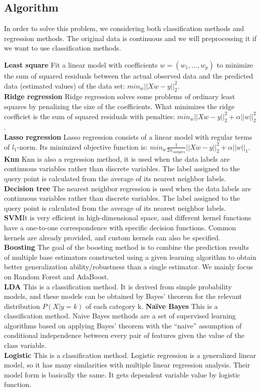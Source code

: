 \documentclass{article}
\begin{document}
\subsection{Algorithm}

In order to solve this problem, we considering both classification methods and regression methods. The original data is continuous and we will preprocessing it if we want to use classification methods.

\textbf{Least square} Fit a linear model with coefficients $w = (w_1, ..., w_p)$ to minimize the sum of squared residuals between the actual observed data and the predicted data (estimated values) of the data set: $min_w ||Xw-y||_2^2$.\\
\textbf{Ridge regression} Ridge regression solves some problems of ordinary least squares by penalizing the size of the coefficients. What minimizes the ridge coefficiet is the sum of squared residuals with penalties: $min_w ||Xw-y||_2^2+\alpha ||w||_2^2$.\\
\textbf{Lasso regression} Lasso regression consists of a linear model with regular terms of $l_1$-norm. Its minimized objective function is: $min_w \frac{1}{2n_{samples}} ||Xw-y||_2^2+\alpha ||w||_1$.\\
\textbf{Knn} Knn is also a regression method, it is used when the data labels are continuous variables rather than discrete variables. The label assigned to the query point is calculated from the average of its nearest neighbor labels.\\
\textbf{Decision tree} The nearest neighbor regression is used when the data labels are continuous variables rather than discrete variables. The label assigned to the query point is calculated from the average of its nearest neighbor labels.\\
\textbf{SVM}It is very efficient in high-dimensional space, and different kernel functions have a one-to-one correspondence with specific decision functions. Common kernels are already provided, and custom kernels can also be specified.\\
\textbf{Boosting} The goal of the boosting method is to combine the prediction results of multiple base estimators constructed using a given learning algorithm to obtain better generalization ability/robustness than a single estimator. We mainly focus on Random Forest and AdaBoost.\\
\textbf{LDA} This is a classification method. It is derived from simple probability models, and these models can be obtained by Bayes' theorem for the relevant distribution $P(X|y=k)$ of each category k.
\textbf{Naïve Bayes} This is a classification method. Naive Bayes methods are a set of supervised learning algorithms based on applying Bayes’ theorem with the “naive” assumption of conditional independence between every pair of features given the value of the class variable.\\
\textbf{Logistic} This is a classification method. Logistic regression is a generalized linear model, so it has many similarities with multiple linear regression analysis. Their model form is basically the same. It gets dependent variable value by logistic function.
\end{document}
